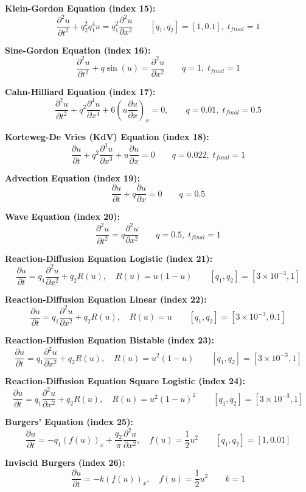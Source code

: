 \textbf{Klein-Gordon Equation (index 15):} 
\[
\frac{\partial^2 u}{\partial t^2} + q_2^2 q_1^4 u = q_1^2 \frac{\partial^2 u}{\partial x^2} \qquad [q_1, q_2] = [1, 0.1], \; t_{final} = 1
\]

\textbf{Sine-Gordon Equation (index 16):} 
\[
\frac{\partial^2 u}{\partial t^2} + q \sin(u) = \frac{\partial^2 u}{\partial x^2} \qquad q = 1, \; t_{final} = 1
\]

\textbf{Cahn-Hilliard Equation (index 17):} 
\[
\frac{\partial^2 u}{\partial t^2} + q^2 \frac{\partial^4 u}{\partial x^4} + 6 \left( u \frac{\partial u}{\partial x} \right)_{x} = 0, \qquad q = 0.01, \; t_{final} = 0.5
\]

\textbf{Korteweg-De Vries (KdV) Equation (index 18):} 
\[
\frac{\partial u}{\partial t} + q^2 \frac{\partial^3 u}{\partial x^3} + u \frac{\partial u}{\partial x} = 0 \qquad q = 0.022, \; t_{final} = 1
\]

\textbf{Advection Equation (index 19):} 
\[
\frac{\partial u}{\partial t} + q \frac{\partial u}{\partial x} = 0 \qquad q = 0.5
\]

\textbf{Wave Equation (index 20):} 
\[
\frac{\partial^2 u}{\partial t^2} = q \frac{\partial^2 u}{\partial x^2} \qquad q = 0.5, \; t_{final} = 1
\]

\textbf{Reaction-Diffusion Equation Logistic (index 21):} 
\[
\frac{\partial u}{\partial t} = q_1 \frac{\partial^2 u}{\partial x^2} + q_2 R(u), \quad R(u) = u(1 - u) \qquad [q_1,q_2] = [3\times 10^{-3}, 1]
\]

\textbf{Reaction-Diffusion Equation Linear (index 22):} 
\[
\frac{\partial u}{\partial t} = q_1 \frac{\partial^2 u}{\partial x^2} + q_2 R(u), \quad R(u) = u \qquad [q_1,q_2] = [3\times 10^{-3}, 0.1]
\]

\textbf{Reaction-Diffusion Equation Bistable (index 23):} 
\[
\frac{\partial u}{\partial t} = q_1 \frac{\partial^2 u}{\partial x^2} + q_2 R(u), \quad R(u) = u^2(1 - u) \qquad[q_1,q_2] = [3\times 10^{-3}, 1]
\]

\textbf{Reaction-Diffusion Equation Square Logistic (index 24):} 
\[
\frac{\partial u}{\partial t} = q_1 \frac{\partial^2 u}{\partial x^2} + q_2 R(u), \quad R(u) = u^2(1 - u)^2 \qquad[q_1,q_2] = [3\times 10^{-3}, 1]
\]

\textbf{Burgers' Equation (index 25):} 
\[
\frac{\partial u}{\partial t} = -q_1 \left( f(u) \right)_x + \frac{q_2}{\pi} \frac{\partial^2 u}{\partial x^2}, \quad f(u) = \frac{1}{2} u^2  \qquad [q_1,q_2] = [1,0.01]
\]

\textbf{Inviscid Burgers (index 26):} 
\[
\frac{\partial u}{\partial t} = -k \left( f(u) \right)_x, \quad f(u) = \frac{1}{2} u^2 \qquad k = 1
\] 

